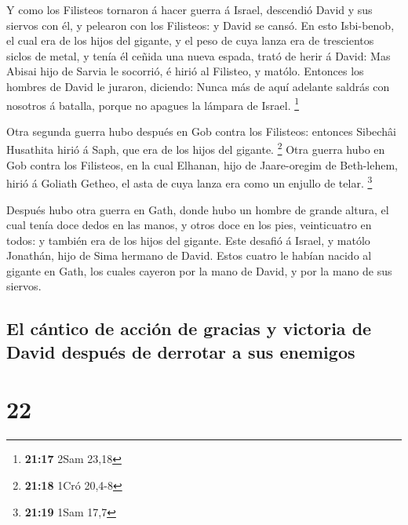  Y como los Filisteos tornaron á hacer guerra á Israel,
descendió David y sus siervos con él, y pelearon con los Filisteos: y
David se cansó.  En esto Isbi-benob, el cual era de los
hijos del gigante, y el peso de cuya lanza era de trescientos siclos de
metal, y tenía él ceñida una nueva espada, trató de herir á David:
 Mas Abisai hijo de Sarvia le socorrió, é hirió al
Filisteo, y matólo. Entonces los hombres de David le juraron, diciendo:
Nunca más de aquí adelante saldrás con nosotros á batalla, porque no
apagues la lámpara de Israel. \footnote{\textbf{21:17} 2Sam 23,18}

 Otra segunda guerra hubo después en Gob contra los
Filisteos: entonces Sibechâi Husathita hirió á Saph, que era de los
hijos del gigante. \footnote{\textbf{21:18} 1Cró 20,4-8} 
Otra guerra hubo en Gob contra los Filisteos, en la cual Elhanan, hijo
de Jaare-oregim de Beth-lehem, hirió á Goliath Getheo, el asta de cuya
lanza era como un enjullo de telar. \footnote{\textbf{21:19} 1Sam 17,7}

 Después hubo otra guerra en Gath, donde hubo un hombre de
grande altura, el cual tenía doce dedos en las manos, y otros doce en
los pies, veinticuatro en todos: y también era de los hijos del gigante.
 Este desafió á Israel, y matólo Jonathán, hijo de Sima
hermano de David.  Estos cuatro le habían nacido al gigante
en Gath, los cuales cayeron por la mano de David, y por la mano de sus
siervos.

\hypertarget{el-cuxe1ntico-de-acciuxf3n-de-gracias-y-victoria-de-david-despuuxe9s-de-derrotar-a-sus-enemigos}{%
\subsection{El cántico de acción de gracias y victoria de David después
de derrotar a sus
enemigos}\label{el-cuxe1ntico-de-acciuxf3n-de-gracias-y-victoria-de-david-despuuxe9s-de-derrotar-a-sus-enemigos}}

\hypertarget{section-21}{%
\section{22}\label{section-21}}

